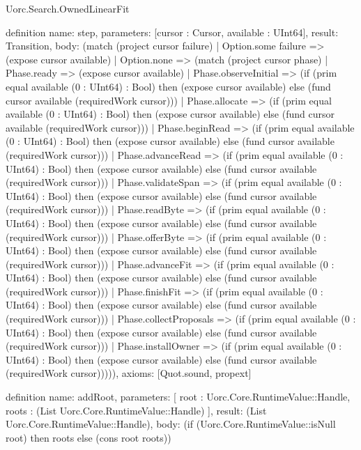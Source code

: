 \begin{lexlean}{Uorc.Search.OwnedLinearFit}
\begin{semanticmodule}
definition{
  name: step,
  parameters: [cursor : Cursor, available : UInt64],
  result: Transition,
  body: (match (project cursor failure)
    | Option.some failure => (expose cursor available)
    | Option.none => (match (project cursor phase)
      | Phase.ready => (expose cursor available)
      | Phase.observeInitial => (if (prim equal available (0 : UInt64) : Bool) then (expose cursor available) else (fund cursor available (requiredWork cursor)))
      | Phase.allocate => (if (prim equal available (0 : UInt64) : Bool) then (expose cursor available) else (fund cursor available (requiredWork cursor)))
      | Phase.beginRead => (if (prim equal available (0 : UInt64) : Bool) then (expose cursor available) else (fund cursor available (requiredWork cursor)))
      | Phase.advanceRead => (if (prim equal available (0 : UInt64) : Bool) then (expose cursor available) else (fund cursor available (requiredWork cursor)))
      | Phase.validateSpan => (if (prim equal available (0 : UInt64) : Bool) then (expose cursor available) else (fund cursor available (requiredWork cursor)))
      | Phase.readByte => (if (prim equal available (0 : UInt64) : Bool) then (expose cursor available) else (fund cursor available (requiredWork cursor)))
      | Phase.offerByte => (if (prim equal available (0 : UInt64) : Bool) then (expose cursor available) else (fund cursor available (requiredWork cursor)))
      | Phase.advanceFit => (if (prim equal available (0 : UInt64) : Bool) then (expose cursor available) else (fund cursor available (requiredWork cursor)))
      | Phase.finishFit => (if (prim equal available (0 : UInt64) : Bool) then (expose cursor available) else (fund cursor available (requiredWork cursor)))
      | Phase.collectProposals => (if (prim equal available (0 : UInt64) : Bool) then (expose cursor available) else (fund cursor available (requiredWork cursor)))
      | Phase.installOwner => (if (prim equal available (0 : UInt64) : Bool) then (expose cursor available) else (fund cursor available (requiredWork cursor))))),
  axioms: [Quot.sound, propext]
}

definition{
  name: addRoot,
  parameters: [
    root : Uorc.Core.RuntimeValue::Handle,
    roots : (List Uorc.Core.RuntimeValue::Handle)
  ],
  result: (List Uorc.Core.RuntimeValue::Handle),
  body: (if (Uorc.Core.RuntimeValue::isNull root) then roots else (cons root roots))
}


\end{semanticmodule}
\end{lexlean}

